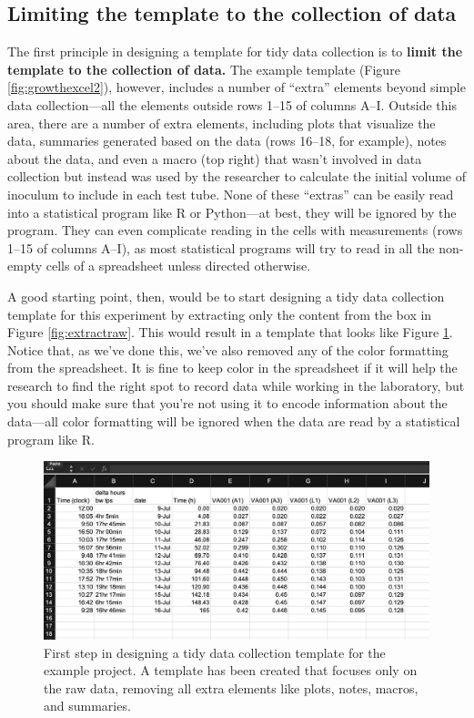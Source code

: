 \documentclass[]{tufte-book}
\begin{document}
\subsection{Limiting the template to the collection of data}\label{limiting-the-template-to-the-collection-of-data}

The first principle in designing a template for tidy data collection is to
\textbf{limit the template to the collection of data.} The example template (Figure
\ref{fig:growthexcel2}), however, includes a number of ``extra'' elements beyond
simple data collection---all the elements outside rows 1--15 of columns A--I.
Outside this area, there are a number of extra elements, including plots that
visualize the data, summaries generated based on the data (rows 16--18, for
example), notes about the data, and even a macro (top right) that wasn't
involved in data collection but instead was used by the researcher to calculate
the initial volume of inoculum to include in each test tube. None of these
``extras'' can be easily read into a statistical program like R or Python---at
best, they will be ignored by the program. They can even complicate reading in
the cells with measurements (rows 1--15 of columns A--I), as most statistical
programs will try to read in all the non-empty cells of a spreadsheet unless
directed otherwise.

A good starting point, then, would be to start designing a tidy data collection
template for this experiment by extracting only the content from the box in
Figure \ref{fig:extractraw}. This would result in a template that looks like
Figure \ref{fig:step1}. Notice that, as we've done this, we've also removed any
of the color formatting from the spreadsheet. It is fine to keep color in the
spreadsheet if it will help the research to find the right spot to record data
while working in the laboratory, but you should make sure that you're not using
it to encode information about the data---all color formatting will be ignored
when the data are read by a statistical program like R.

\begin{figure}
\includegraphics[width=\textwidth]{figures/growth_curve_step1} \caption[First step in designing a tidy data collection template for the example project]{First step in designing a tidy data collection template for the example project. A template has been created that focuses only on the raw data, removing all extra elements like plots, notes, macros, and summaries.}\label{fig:step1}
\end{figure}
\end{document}
